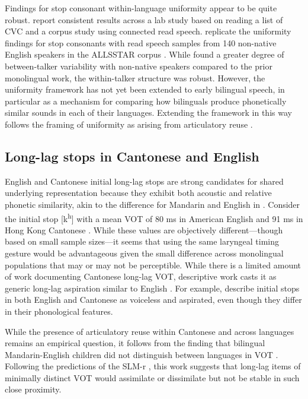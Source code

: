 Findings for stop consonant within-language uniformity appear to be quite robust. \citet{chodroff_2017_structure} report consistent results across a lab study based on reading a list of CVC and a corpus study using connected read speech. \citet{chodroff_2019_l2} replicate the uniformity findings for stop consonants with read speech samples from 140 non-native English speakers in the ALLSSTAR corpus \citep[wide range of native languages][]{bradlow_2011_allsstar}. While \citet{chodroff_2019_l2} found a greater degree of between-talker variability with non-native speakers compared to the prior monolingual work, the within-talker structure was robust. However, the uniformity framework has not yet been extended to early bilingual speech, in particular as a mechanism for comparing how bilinguals produce phonetically similar sounds in each of their languages. Extending the framework in this way follows the framing of uniformity as arising from articulatory reuse \citep{faytak_2018_uniformity}. 

\subsection{Long-lag stops in Cantonese and English}\label{ch4:sec:rqs}

English and Cantonese initial long-lag stops are strong candidates for shared underlying representation because they exhibit both acoustic and relative phonetic similarity, akin to the difference for Mandarin and English in \citet{yang_2019_vot}. Consider the initial stop [k\textsuperscript{h}] with a mean VOT of 80 ms in American English \citep{lisker_1964_vot} and 91 ms in Hong Kong Cantonese \citep{clumeck_1981_cantonese}. While these values are objectively different---though based on small sample sizes---it seems that using the same laryngeal timing gesture would be advantageous given the small difference across monolingual populations that may or may not be perceptible. While there is a limited amount of work documenting Cantonese long-lag VOT, descriptive work casts it as generic long-lag aspiration similar to English \citep{matthews_2013_cantonese, bauer_1997_cantonese, chan_2000_english,mielke_2018_voice}. For example, \citet{matthews_2013_cantonese} describe initial stops in both English and Cantonese as voiceless and aspirated, even though they differ in their phonological features. 
 
While the presence of articulatory reuse within Cantonese and across languages remains an empirical question, it follows from the finding that bilingual Mandarin-English children did not distinguish between languages in VOT \citep{yang_2019_vot}. Following the predictions of the SLM-r \citep{flege_2021_slmr}, this work suggests that long-lag items of minimally distinct VOT would assimilate or dissimilate but not be stable in such close proximity. 

